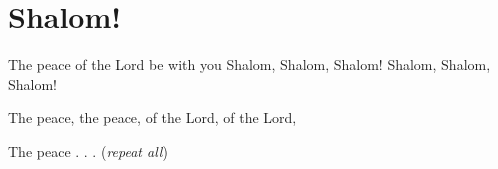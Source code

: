 \starttocol
\chapter{Shalom!}
\nexttocol
\hfill{\it }
\stoptocol
\startlines
T{\sc he} peace of the Lord be with you
Shalom, Shalom, Shalom!
Shalom, Shalom, Shalom!

The peace, the peace, of the Lord, of the Lord,

The peace . . .  \hfill({\it repeat all})~~~~~~~~~~~~~~~~~~
\stoplines

